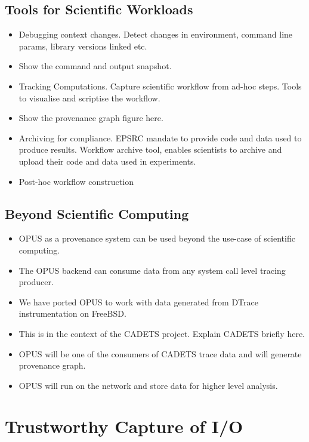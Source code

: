 \documentclass[withindex,glossary]{cam-thesis}
\begin{document}
\section{Tools for Scientific Workloads}
\begin{itemize}
\item Debugging context changes. Detect changes in environment, command line params, library versions linked etc.
\item Show the command and output snapshot.
\item Tracking Computations. Capture scientific workflow from ad-hoc steps. Tools to visualise and scriptise the workflow.
\item Show the provenance graph figure here.
\item Archiving for compliance. EPSRC mandate to provide code and data used to produce results. Workflow archive tool, enables scientists to archive and upload their code and data used in experiments.
\item Post-hoc workflow construction
\end{itemize}


\section{Beyond Scientific Computing}
\begin{itemize}
\item OPUS as a provenance system can be used beyond the use-case of scientific computing.
\item The OPUS backend can consume data from any system call level tracing producer.
\item We have ported OPUS to work with data generated from DTrace instrumentation on FreeBSD.
\item This is in the context of the CADETS project. Explain CADETS briefly here.
\item OPUS will be one of the consumers of CADETS trace data and will generate provenance graph.
\item OPUS will run on the network and store data for higher level analysis.
\end{itemize}


\chapter{Trustworthy Capture of I/O}
\end{document}
